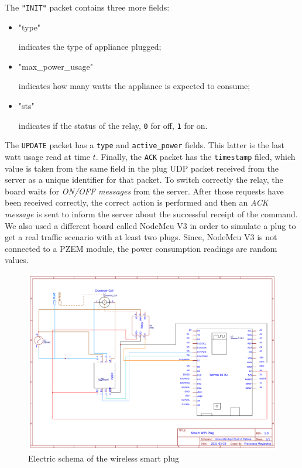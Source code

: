 \documentclass[conference]{IEEEtran}
\begin{document}
	The \verb|"INIT"| packet contains three more fields:
	\begin{itemize}
		\item \begin{spverbatim}"type"\end{spverbatim} indicates the type of appliance plugged;
		\item \begin{spverbatim}"max_power_usage"\end{spverbatim} indicates how many watts the appliance is expected to consume;
		\item \begin{spverbatim}"sts"\end{spverbatim} indicates if the status of the relay, \verb|0| for off, \verb|1| for on.
	\end{itemize}
	The \verb|UPDATE| packet has a \verb|type| and \verb|active_power| fields. This latter is the last watt usage read at time $t$. Finally, the \verb|ACK| packet has the \verb|timestamp| filed, which value is taken from the same field in the plug UDP packet received from the server as a unique identifier for that packet.
	To switch correctly the relay, the board waits for \textit{ON/OFF messages} from the server. After those requests have been received correctly, the correct action is performed and then an \textit{ACK message} is sent to inform the server about the successful receipt of the command. 
	We also used a different board called NodeMcu V3 in order to simulate a plug to get a real traffic scenario with at least two plugs. Since, NodeMcu V3 is not connected to a PZEM module, the power consumption readings are random values.  
	\begin{figure}[htbp]
		\centering
		\includegraphics[width=\linewidth]{assets/pcb_schema}
		\caption{Electric schema of the wireless smart plug}
		\label{fig:pcbschema}
	\end{figure}
\end{document}
